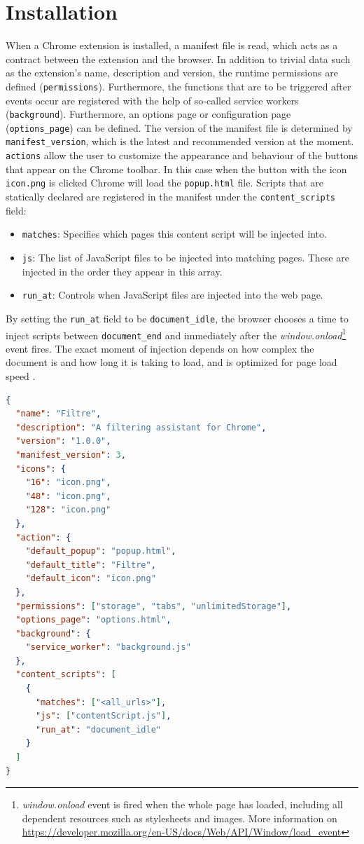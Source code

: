\section{Installation}
When a Chrome extension is installed, a manifest file is read, which acts as a contract between the extension and the browser. In addition to trivial data such as the extension's name, description and version, the runtime permissions are defined (\texttt{permissions}). Furthermore, the functions that are to be triggered after events occur are registered with the help of so-called service workers (\texttt{background}). Furthermore, an options page or configuration page (\verb;options_page;) can be defined. The version of the manifest file is determined by \verb;manifest_version;, which is the latest and recommended version at the moment. \texttt{actions} allow the user to customize the appearance and behaviour of the buttons that appear on the Chrome toolbar. In this case when the button with the icon \texttt{icon.png} is clicked Chrome will load the \texttt{popup.html} file. Scripts that are statically declared are registered in the manifest under the \verb;content_scripts; field:
\begin{itemize}
  \item \texttt{matches}: Specifies which pages this content script will be injected into.
  \item \texttt{js}: The list of JavaScript files to be injected into matching pages. These are injected in the order they appear in this array.
  \item \verb;run_at;: Controls when JavaScript files are injected into the web page.
\end{itemize}

By setting the \verb;run_at; field to be \verb;document_idle;, the browser chooses a time to inject scripts between \verb;document_end; and immediately after the \emph{window.onload}\footnote{\emph{window.onload} event is fired when the whole page has loaded, including all dependent resources such as stylesheets and images. More information on \url{https://developer.mozilla.org/en-US/docs/Web/API/Window/load_event}} event fires. The exact moment of injection depends on how complex the document is and how long it is taking to load, and is optimized for page load speed \autocite{chrome2021runtime}.

\begin{lstlisting}[language=json, caption={Manifest File (JSON)}, label={lst:manifest}]
{
  "name": "Filtre",
  "description": "A filtering assistant for Chrome",
  "version": "1.0.0",
  "manifest_version": 3,
  "icons": {
    "16": "icon.png",
    "48": "icon.png",
    "128": "icon.png"
  },
  "action": {
    "default_popup": "popup.html",
    "default_title": "Filtre",
    "default_icon": "icon.png"
  },
  "permissions": ["storage", "tabs", "unlimitedStorage"],
  "options_page": "options.html",
  "background": {
    "service_worker": "background.js"
  },
  "content_scripts": [
    {
      "matches": ["<all_urls>"],
      "js": ["contentScript.js"],
      "run_at": "document_idle"
    }
  ]
}
\end{lstlisting}

